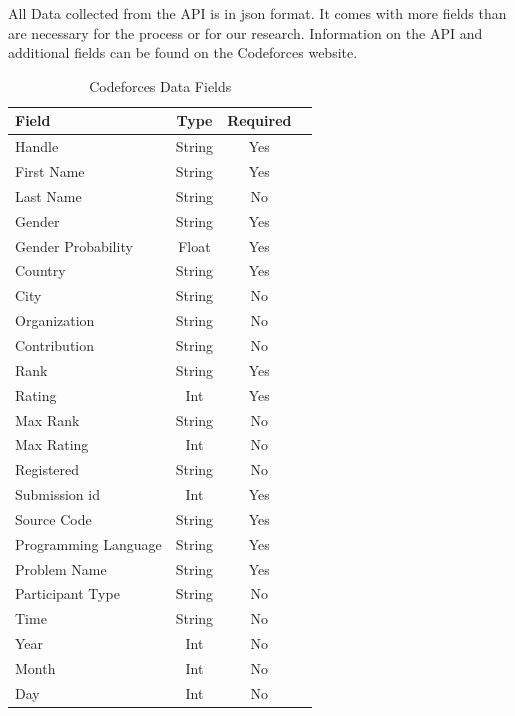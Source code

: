\documentclass[12pt]{article}
\begin{document}
All Data collected from the API is in json format. It comes with more fields than are necessary for the process or for our research. Information on the API and additional fields can be found on the Codeforces website.

\begin{table}[t]
    \begin{center}
        \caption{Codeforces Data Fields}
        \label{tab:cf_data}
        \begin{tabular}{|l | c | c | c |}
            \hline
            \textbf{Field} & \textbf{Type} & \textbf{Required}\\
            \hline
            Handle & String & Yes\\
            First Name & String & Yes\\
            Last Name & String & No\\
            Gender & String & Yes\\
            Gender Probability & Float & Yes\\
            Country & String & Yes\\
            City & String & No\\
            Organization & String & No\\
            Contribution & String & No\\
            Rank & String & Yes\\
            Rating & Int & Yes\\
            Max Rank & String & No\\
            Max Rating & Int & No\\
            Registered & String & No\\
            \hline
            Submission id & Int & Yes\\
            Source Code & String & Yes\\
            Programming Language & String & Yes\\
            Problem Name & String & Yes\\
            Participant Type & String & No\\
            Time & String & No\\
            Year & Int & No\\
            Month & Int & No\\
            Day & Int & No\\
            \hline
        \end{tabular}
    \end{center}
\end{table}
\end{document}

